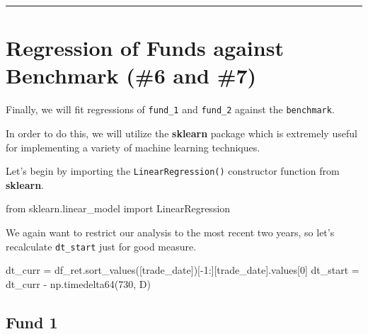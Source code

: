 \documentclass[
  letterpaper,
  DIV=11,
  numbers=noendperiod]{scrreprt}
\newenvironment{Shaded}{\begin{snugshade}}{\end{snugshade}}
\newcommand{\DecValTok}[1]{\textcolor[rgb]{0.68,0.00,0.00}{#1}}
\newcommand{\ImportTok}[1]{\textcolor[rgb]{0.00,0.46,0.62}{#1}}
\newcommand{\NormalTok}[1]{\textcolor[rgb]{0.00,0.23,0.31}{#1}}
\newcommand{\OperatorTok}[1]{\textcolor[rgb]{0.37,0.37,0.37}{#1}}
\newcommand{\StringTok}[1]{\textcolor[rgb]{0.13,0.47,0.30}{#1}}
\begin{document}
\begin{center}\rule{0.5\linewidth}{0.5pt}\end{center}

\hypertarget{regression-of-funds-against-benchmark-6-and-7}{%
\section{Regression of Funds against Benchmark (\#6 and
\#7)}\label{regression-of-funds-against-benchmark-6-and-7}}

Finally, we will fit regressions of \texttt{fund\_1} and
\texttt{fund\_2} against the \texttt{benchmark}.

In order to do this, we will utilize the \textbf{sklearn} package which
is extremely useful for implementing a variety of machine learning
techniques.

Let's begin by importing the \texttt{LinearRegression()} constructor
function from \textbf{sklearn}.

\begin{Shaded}
\begin{Highlighting}[]
\ImportTok{from}\NormalTok{ sklearn.linear\_model }\ImportTok{import}\NormalTok{ LinearRegression}
\end{Highlighting}
\end{Shaded}

We again want to restrict our analysis to the most recent two years, so
let's recalculate \texttt{dt\_start} just for good measure.

\begin{Shaded}
\begin{Highlighting}[]
\NormalTok{dt\_curr }\OperatorTok{=}\NormalTok{ df\_ret.sort\_values([}\StringTok{\textquotesingle{}trade\_date\textquotesingle{}}\NormalTok{])[}\OperatorTok{{-}}\DecValTok{1}\NormalTok{:][}\StringTok{\textquotesingle{}trade\_date\textquotesingle{}}\NormalTok{].values[}\DecValTok{0}\NormalTok{]}
\NormalTok{dt\_start }\OperatorTok{=}\NormalTok{ dt\_curr }\OperatorTok{{-}}\NormalTok{ np.timedelta64(}\DecValTok{730}\NormalTok{, }\StringTok{\textquotesingle{}D\textquotesingle{}}\NormalTok{)}
\end{Highlighting}
\end{Shaded}

\hypertarget{fund-1}{%
\subsection{Fund 1}\label{fund-1}}
\end{document}
